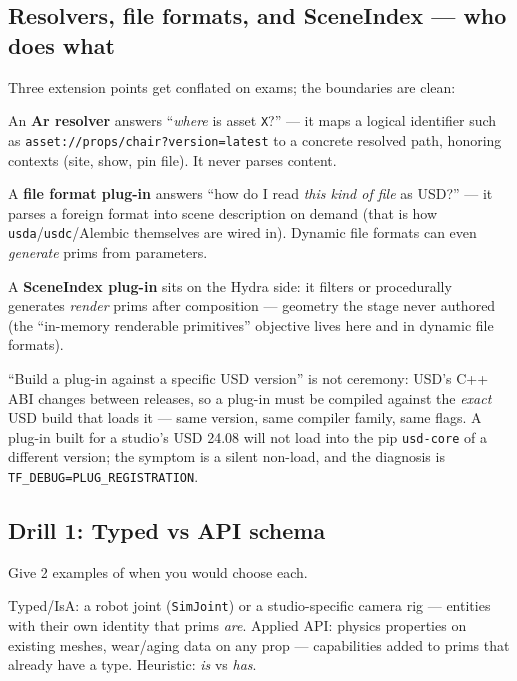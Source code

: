 \subsection{Resolvers, file formats, and SceneIndex --- who does what}\label{sec:cu-ext}
Three extension points get conflated on exams; the boundaries are clean:

An \textbf{Ar resolver} answers ``\emph{where} is asset
\texttt{X}?'' --- it maps a logical identifier such as
\texttt{asset://props/chair?\allowbreak version=latest} to a concrete
resolved path,
honoring contexts (site, show, pin file). It never parses content.

A \textbf{file format plug-in} answers ``how do I
read \emph{this kind of file} as USD?'' --- it parses a foreign format into
scene description on demand (that is how \texttt{usda}/\texttt{usdc}/Alembic
themselves are wired in). Dynamic file formats can even \emph{generate}
prims from parameters.

A \textbf{SceneIndex plug-in} sits on the Hydra side:
it filters or procedurally generates \emph{render} prims after composition
--- geometry the stage never authored (the ``in-memory renderable
primitives'' objective lives here and in dynamic file formats).

\begin{Gotcha}
``Build a plug-in against a specific USD version'' is not ceremony: USD's
C++ ABI changes between releases, so a plug-in must be compiled against the
\emph{exact} USD build that loads it --- same version, same compiler
family, same flags. A plug-in built for a studio's USD 24.08 will not load
into the pip \texttt{usd-core} of a different version; the symptom is a
silent non-load, and the diagnosis is \texttt{TF\_DEBUG=PLUG\_REGISTRATION}.
\end{Gotcha}

\DrillsTitle
\subsection*{Drill 1: Typed vs API schema}
Give 2 examples of when you would choose each.
\begin{DrillSolution}
Typed/IsA: a robot joint (\texttt{SimJoint}) or a studio-specific camera rig
--- entities with their own identity that prims \emph{are}. Applied API:
physics properties on existing meshes, wear/aging data on any prop ---
capabilities added to prims that already have a type. Heuristic: \emph{is}
vs \emph{has}.
\end{DrillSolution}

